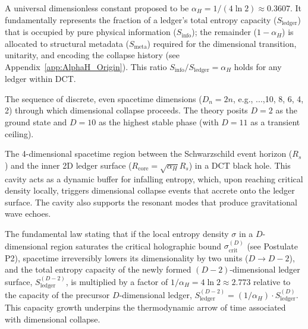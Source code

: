 \documentclass[a4paper, 12pt, oneside]{book}
\numberwithin{equation}{chapter}
\begin{document}
\medskip
{}\par\nopagebreak
\medskip
A universal dimensionless constant proposed to be $\alpha_H = 1/(4\ln 2) \approx 0.3607$. It fundamentally represents the fraction of a ledger's total entropy capacity ($S_{\text{ledger}}$) that is occupied by pure physical information ($S_{\text{info}}$); the remainder ($1-\alpha_H$) is allocated to structural metadata ($S_{\text{meta}}$) required for the dimensional transition, unitarity, and encoding the collapse history (see Appendix~\ref{app:AlphaH_Origin}). This ratio $S_{\text{info}}/S_{\text{ledger}} = \alpha_H$ holds for any ledger within DCT.
\bigskip

\medskip
{}\par\nopagebreak
\medskip
The sequence of discrete, even spacetime dimensions ($D_n = 2n$, e.g., ...,10, 8, 6, 4, 2) through which dimensional collapse proceeds. The theory posits $D=2$ as the ground state and $D=10$ as the highest stable phase (with $D=11$ as a transient ceiling).
\bigskip

\medskip
{}\par\nopagebreak
\medskip
The 4-dimensional spacetime region between the Schwarzschild event horizon ($R_s$) and the inner 2D ledger surface ($R_{\text{core}} = \sqrt{\alpha_H}R_s$) in a DCT black hole. This cavity acts as a dynamic buffer for infalling entropy, which, upon reaching critical density locally, triggers dimensional collapse events that accrete onto the ledger surface. The cavity also supports the resonant modes that produce gravitational wave echoes.
\bigskip

\medskip
{}\par\nopagebreak
\medskip
The fundamental law stating that if the local entropy density $\sigma$ in a $D$-dimensional region saturates the critical holographic bound $\sigma_{\mathrm{crit}}^{(D)}$ (see Postulate P2), spacetime irreversibly lowers its dimensionality by two units ($D \to D-2$), and the total entropy capacity of the newly formed $(D-2)$-dimensional ledger surface, $S_{\text{ledger}}^{(D-2)}$, is multiplied by a factor of $1/\alpha_H = 4\ln 2 \approx 2.773$ relative to the capacity of the precursor $D$-dimensional ledger, $S_{\text{ledger}}^{(D-2)} = (1/\alpha_H) \cdot S_{\text{ledger}}^{(D)}$. This capacity growth underpins the thermodynamic arrow of time associated with dimensional collapse.
\bigskip
\end{document}
